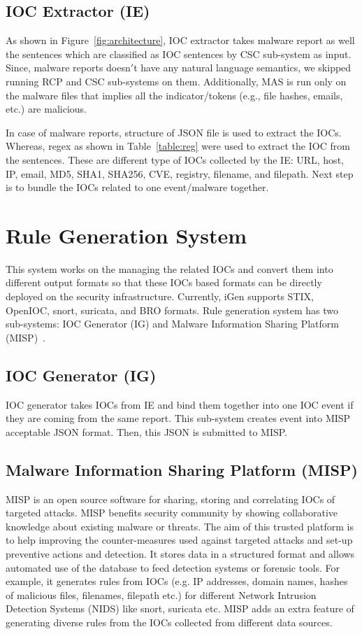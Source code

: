 \subsection{IOC Extractor (IE)}
As shown in Figure~\ref{fig:architecture}, IOC extractor takes malware report as well the sentences which are classified as IOC sentences by CSC sub-system as input. Since, malware reports doesn$'$t have any natural language semantics, we skipped running RCP and CSC sub-systems on them. Additionally, MAS is run only on the malware files that implies all the indicator/tokens (e.g., file hashes, emails, etc.) are malicious.

In case of malware reports, structure of JSON file is used to extract the IOCs. Whereas, regex as shown in Table~\ref{table:reg} were used to extract the IOC from the sentences. These are different type of IOCs collected by the IE: URL, host, IP, email, MD5, SHA1, SHA256, CVE, registry, filename, and filepath. Next step is to bundle the IOCs related to one event/malware together.



\section{Rule Generation System}
This system works on the managing the related IOCs and convert them into different output formats so that these IOCs based formats can be directly deployed on the security infrastructure. Currently, iGen supports STIX, OpenIOC, snort, suricata, and BRO formats. Rule generation system has two sub-systems: IOC Generator (IG) and Malware Information Sharing Platform (MISP)~\cite{misp}.

\subsection{IOC Generator (IG)}
IOC generator takes IOCs from IE and bind them together into one IOC event if they are coming from the same report. This sub-system creates event into MISP acceptable JSON format. Then, this JSON is submitted to MISP. 

\subsection{Malware Information Sharing Platform (MISP)}
MISP is an open source software for sharing, storing and correlating IOCs of targeted attacks. MISP benefits security community by showing collaborative knowledge about existing malware or threats. The aim of this trusted platform is to help improving the counter-measures used against targeted attacks and set-up preventive actions and detection. It stores data in a structured format and allows automated use of the database to feed detection systems or forensic tools. For example, it generates rules from IOCs (e.g. IP addresses, domain names, hashes of malicious files, filenames, filepath etc.) for different Network Intrusion Detection Systems (NIDS) like snort, suricata etc. MISP adds an extra feature of generating diverse rules from the IOCs collected from different data sources.

